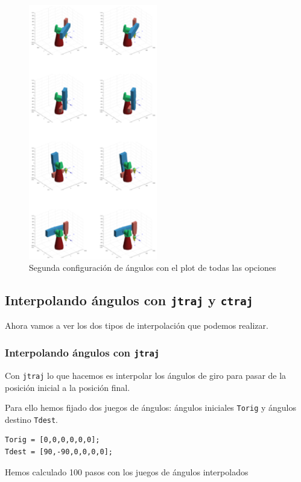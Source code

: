 \documentclass{article}
\begin{document}
\begin{figure}[h]
\centering
\includegraphics[width=0.5\textwidth]{montage.eps}
\caption{Segunda configuración de ángulos con el plot de todas las opciones}
\label{fig:pumaDosAll}
\end{figure}

\subsection{Interpolando ángulos con {\tt jtraj} y {\tt ctraj}}
Ahora vamos a ver los dos tipos de interpolación que podemos realizar.
\subsubsection{Interpolando ángulos con {\tt jtraj}}
Con {\tt jtraj} lo que hacemos es interpolar los ángulos de giro
para pasar de la posición inicial a la posición final.

Para ello hemos fijado dos juegos de ángulos: ángulos iniciales {\tt Torig} y ángulos destino {\tt Tdest}.

\begin{lstlisting}[frame=single]
Torig = [0,0,0,0,0,0];
Tdest = [90,-90,0,0,0,0];
\end{lstlisting}

Hemos calculado 100 pasos con los juegos de ángulos interpolados
\end{document}
